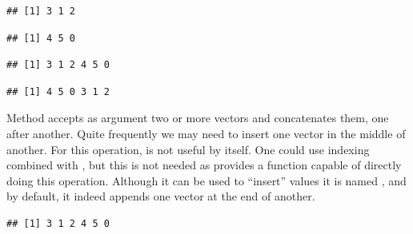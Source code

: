 \documentclass[krantz2]{krantz}\usepackage{knitr}%
\begin{document}
\begin{knitrout}\footnotesize
{}\color{fgcolor}\begin{kframe}
\begin{alltt}
 \hlkwb{<-} \hlstd{(}\hlstd{,} \hlstd{,} \hlstd{)}
\end{alltt}
\begin{verbatim}
## [1] 3 1 2
\end{verbatim}
\begin{alltt}
 \hlkwb{<-} \hlstd{(}\hlstd{,} \hlstd{,} \hlstd{)}
\end{alltt}
\begin{verbatim}
## [1] 4 5 0
\end{verbatim}
\begin{alltt}
 \hlkwb{<-} 
\end{alltt}
\begin{verbatim}
## [1] 3 1 2 4 5 0
\end{verbatim}
\begin{alltt}
 \hlkwb{<-} 
\end{alltt}
\begin{verbatim}
## [1] 4 5 0 3 1 2
\end{verbatim}
\end{kframe}
\end{knitrout}

Method  accepts as argument two or more vectors and concatenates them, one after another. Quite frequently we may need to insert one vector in the middle of another. For this operation,  is not useful by itself. One could use indexing combined with , but this is not needed as \Rlang provides a function capable of directly doing this operation. Although it can be used to ``insert'' values it is named , and by default, it indeed appends one vector at the end of another.

\begin{knitrout}\footnotesize
{}\color{fgcolor}\begin{kframe}
\begin{alltt}
\end{alltt}
\begin{verbatim}
## [1] 3 1 2 4 5 0
\end{verbatim}
\end{kframe}
\end{knitrout}
\end{document}
